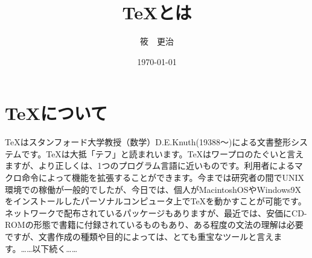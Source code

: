 \documentclass[twocolumn,10pt]{jarticle}
\title{\TeX とは}
\author{筱　更治}
\date{\today}
\begin{document}
\maketitle

\section{\TeX について}

TeXはスタンフォード大学教授（数学）D.E.Knuth(19388～)による文書整形システムです。TeXは大抵「テフ」と読まれいます。TeXはワープロのたぐいと言えますが、より正しくは、1つのプログラム言語に近いものです。利用者によるマクロ命令によって機能を拡張することができます。今までは研究者の間でUNIX環境での稼働が一般的でしたが、今日では、個人がMacintoshOSやWindows9Xをインストールしたパーソナルコンピュータ上でTeXを動かすことが可能です。ネットワークで配布されているパッケージもありますが、最近では、安価にCD-ROMの形態で書籍に付録されているものもあり、ある程度の文法の理解は必要ですが、文書作成の種類や目的によっては、とても重宝なツールと言えます。……以下続く……



\end{document}
